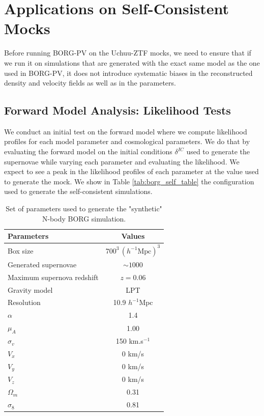 \section{Applications on Self-Consistent Mocks} \label{sec:borg_self}
Before running BORG-PV on the Uchuu-ZTF mocks, we need to ensure that if we run it on simulations that are generated with the exact same model as the one used in BORG-PV, 
it does not introduce systematic biases in the reconstructed density and velocity fields as well as in the parameters. \\

\subsection{Forward Model Analysis: Likelihood Tests} \label{sec:profile_self}
We conduct an initial test on the forward model where we compute likelihood profiles for each model parameter and cosmological parameters. We do that by evaluating 
the forward model on the initial conditions $\delta^{IC}$ used to generate the supernovae while varying each parameter and evaluating the likelihood. We 
expect to see a peak in the likelihood profiles of each parameter at the value used to generate the mock. We show in Table \ref{tab:borg_self_table} the configuration 
used to generate the self-consistent simulations. \\
\begin{table}[ht]
    \centering
    \caption{Set of parameters used to generate the "synthetic" N-body BORG simulation.}
    \label{tab:borg_self_table}
    \begin{tabular}{|l|c|}
        \hline
        Parameters & Values \\
        \hline
        Box size & $700^3 \, (h^{-1}\text{Mpc})^3$ \\
        Generated supernovae & $\sim 1000$ \\
        Maximum supernova redshift & $z=0.06$ \\
        Gravity model & LPT \\
        Resolution & 10.9 $h^{-1}\text{Mpc}$ \\
        $\alpha$ & 1.4 \\
        $\mu_A$ & 1.00 \\
        $\sigma_v$ & 150 km.s$^{-1}$ \\
        $V_x$ & 0 km/s \\
        $V_y$ & 0 km/s \\
        $V_z$ & 0 km/s \\
        $\Omega_m$ & 0.31 \\
        $\sigma_8$ & 0.81 \\
        \hline
    \end{tabular}
    \label{tab:self_params}
\end{table}

